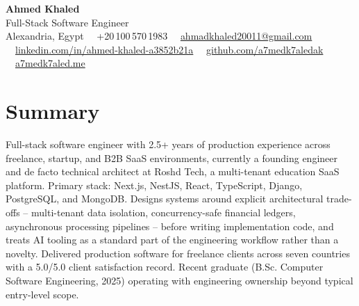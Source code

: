 \documentclass[10.5pt,letterpaper]{article}
\newcommand{\sectionrule}{\vspace{-1pt}{\color{hairline}\hrule height 0.6pt}\vspace{6pt}}
\begin{document}
\begin{center}
    {\fontsize{25}{27}\selectfont\textbf{Ahmed Khaled}}\\[4pt]
    {\color{accent}\fontsize{11}{13}\selectfont Full-Stack Software Engineer}\\[6pt]
    {\small\color{muted}
      Alexandria, Egypt \ \textperiodcentered\ +20\,100\,570\,1983 \ \textperiodcentered\
      \href{mailto:ahmadkhaled20011@gmail.com}{ahmadkhaled20011@gmail.com} \ \textperiodcentered\
      \href{https://www.linkedin.com/in/ahmed-khaled-a3852b21a/}{linkedin.com/in/ahmed-khaled-a3852b21a} \ \textperiodcentered\
      \href{https://github.com/a7medk7aledak}{github.com/a7medk7aledak} \ \textperiodcentered\
      \href{https://a7medk7aled.me}{a7medk7aled.me}
    }
\end{center}
\vspace{2pt}

\section*{Summary}
\sectionrule
Full-stack software engineer with 2.5+ years of production experience across freelance, startup, and B2B SaaS
environments, currently a founding engineer and de facto technical architect at Roshd Tech, a multi-tenant
education SaaS platform. Primary stack: Next.js, NestJS, React, TypeScript, Django, PostgreSQL, and MongoDB.
Designs systems around explicit architectural trade-offs -- multi-tenant data isolation, concurrency-safe
financial ledgers, asynchronous processing pipelines -- before writing implementation code, and treats AI
tooling as a standard part of the engineering workflow rather than a novelty. Delivered production software
for freelance clients across seven countries with a 5.0/5.0 client satisfaction record. Recent graduate
(B.Sc. Computer Software Engineering, 2025) operating with engineering ownership beyond typical entry-level scope.

\end{document}
